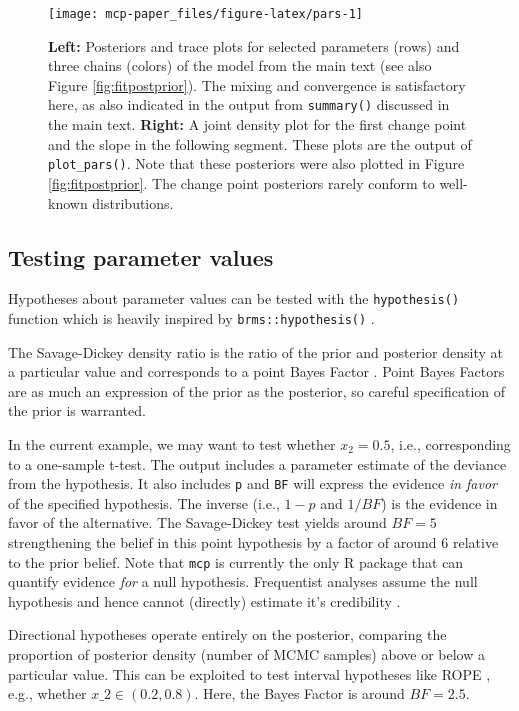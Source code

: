 \documentclass[
  american,
]{article}
\begin{document}
\begin{figure}
\texttt{[image: mcp-paper\_files/figure-latex/pars-1]} \caption{\textbf{Left:} Posteriors and trace plots for selected parameters (rows) and three chains (colors) of the model from the main text (see also Figure \ref{fig:fitpostprior}). The mixing and convergence is satisfactory here, as also indicated in the output from \texttt{summary()} discussed in the main text. \textbf{Right:} A joint density plot for the first change point and the slope in the following segment. These plots are the output of \texttt{plot\_pars()}. Note that these posteriors were also plotted in Figure \ref{fig:fitpostprior}. The change point posteriors rarely conform to well-known distributions.}\label{fig:pars}
\end{figure}



\hypertarget{testing-parameter-values}{%
\subsection{Testing parameter values}\label{testing-parameter-values}}

Hypotheses about parameter values can be tested with the \texttt{hypothesis()} function which is heavily inspired by \texttt{brms::hypothesis()} \citep{burkner2017}.

The Savage-Dickey density ratio is the ratio of the prior and posterior density at a particular value and corresponds to a point Bayes Factor \citep{verdinelli1995}. Point Bayes Factors are as much an expression of the prior as the posterior, so careful specification of the prior is warranted.

In the current example, we may want to test whether \(x_2 = 0.5\), i.e., corresponding to a one-sample t-test. The output includes a parameter estimate of the deviance from the hypothesis. It also includes \texttt{p} and \texttt{BF} will express the evidence \emph{in favor} of the specified hypothesis. The inverse (i.e., \(1 - p\) and \(1 / BF\)) is the evidence in favor of the alternative. The Savage-Dickey test yields around \(BF = 5\) strengthening the belief in this point hypothesis by a factor of around 6 relative to the prior belief. Note that \texttt{mcp} is currently the only R package that can quantify evidence \emph{for} a null hypothesis. Frequentist analyses assume the null hypothesis and hence cannot (directly) estimate it's credibility \citep{kruschke2018, colquhoun2014}.

Directional hypotheses operate entirely on the posterior, comparing the proportion of posterior density (number of MCMC samples) above or below a particular value. This can be exploited to test interval hypotheses like ROPE \citep{kruschke2011}, e.g., whether \(x\_2 \in (0.2, 0.8)\). Here, the Bayes Factor is around \(BF = 2.5\).
\end{document}
